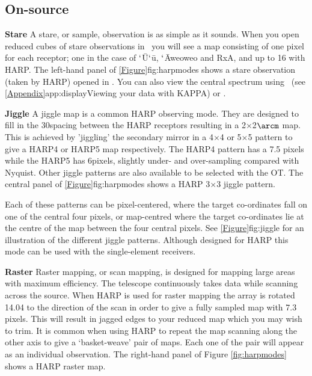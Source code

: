 \documentclass[11pt,oneside,chapters]{starlink}
\newcommand{\udeg}{\hspace{-0.3em}\dgs\hspace{-0.08em}}
\newcommand{\uarcs}{\hspace{-0.27em}\arcsec\hspace{-0.07em}}
\newcommand{\udeg}{\HCode{&deg}}
\newcommand{\uarcs}{$''$}
\begin{document}
\subsection{On-source}

\begin{aligndesc}
\item[\textbf{Stare}]
A stare, or sample, observation is as simple as it sounds. When you
open reduced cubes of stare observations in \gaia\ you will see a map
consisting of one pixel for each receptor; one in the case of
$`$\=U$`$\=u, $`$\=Aweoweo and RxA, and up to 16 with HARP.
The left-hand panel of \cref{Figure}{fig:harpmodes}{}
shows a stare observation (taken by HARP) opened in \gaia. You can also view the
central spectrum using \linplot\ (see \cref{Appendix}{app:display}{Viewing
your data with KAPPA}) or \splat.

\item[\textbf{Jiggle}]
A jiggle map is a common HARP observing mode. They are designed to
fill in the 30\arcsec spacing between the HARP receptors resulting in a
2\arcm$\times$2$\arcm$ map. This is achieved by 'jiggling' the secondary
mirror in a 4$\times$4 or 5$\times$5 pattern to give a HARP4 or HARP5
map respectively. The HARP4 pattern has a 7.\uarcs5 pixels while the
HARP5 has 6\arcsec pixels, slightly under- and over-sampling compared
with Nyquist. Other jiggle patterns are also available to be selected with the OT.
The central panel of \cref{Figure}{fig:harpmodes}{} shows a
HARP 3$\times$3 jiggle pattern.

Each of these patterns can be pixel-centered, where the target
co-ordinates fall on one of the central four pixels, or map-centred where
the target co-ordinates lie at the centre of the map between the four
central pixels. See \cref{Figure}{fig:jiggle}{} for an illustration of the
different jiggle patterns. Although designed for HARP this mode can be
used with the single-element receivers.

\item[\textbf{Raster}]
Raster mapping, or scan mapping, is designed for mapping large areas
with maximum efficiency. The telescope continuously takes data while
scanning across the source. When HARP is used for raster mapping the
array is rotated 14.\udeg04 to the direction of the scan in order
to give a fully sampled map with 7.\uarcs3 pixels. This will result in
jagged edges to your reduced map which you may wish to trim. It is
common when using HARP to repeat the map scanning along the other axis
to give a `basket-weave' pair of maps. Each one of the pair will
appear as an individual observation.  The right-hand panel of Figure
\ref{fig:harpmodes} shows a HARP raster map.
\end{aligndesc}
\end{document}

